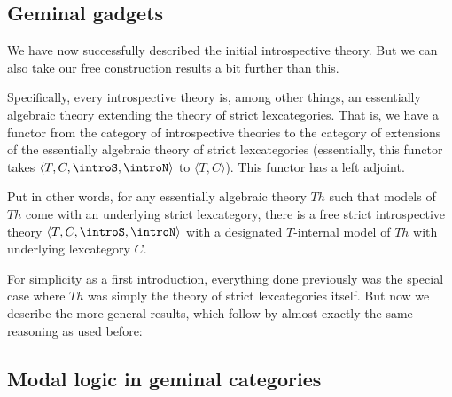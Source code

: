 \subsection{Geminal gadgets}
We have now successfully described the initial introspective theory. But we can also take our free construction results a bit further than this.

Specifically, every introspective theory is, among other things, an essentially algebraic theory extending the theory of strict lexcategories. That is, we have a functor from the category of introspective theories to the category of extensions of the essentially algebraic theory of strict lexcategories (essentially, this functor takes $\langle T, C, \introS, \introN \rangle$ to $\langle T, C \rangle$). This functor has a left adjoint.

Put in other words, for any essentially algebraic theory $Th$ such that models of $Th$ come with an underlying strict lexcategory, there is a free strict introspective theory $\langle T, C, \introS, \introN \rangle$ with a designated $T$-internal model of $Th$ with underlying lexcategory $C$.

For simplicity as a first introduction, everything done previously was the special case where $Th$ was simply the theory of strict lexcategories itself. But now we describe the more general results, which follow by almost exactly the same reasoning as used before:



\subsection{Modal logic in geminal categories}

